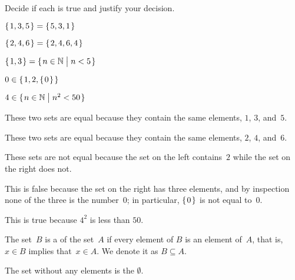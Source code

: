 \documentclass{ibl}  %
\begin{document}
\begin{problem}[\midlength] 
Decide if each is true and justify your decision.
\begin{items}
\item $\mbox{$\{\hspace{0.1em}1,3,5\hspace{0.1em}\}$}=\mbox{$\{\hspace{0.1em}5,3,1\hspace{0.1em}\}$}$    
\item $\mbox{$\{\hspace{0.1em}2, 4, 6\hspace{0.1em}\}$}=\mbox{$\{\hspace{0.1em}2, 4, 6, 4\hspace{0.1em}\}$}$    
\item $\mbox{$\{\hspace{0.1em}1, 3\hspace{0.1em}\}$}=\mbox{$\{\hspace{0.1em}n\in\mathbb{N}\bigm| n<5\hspace{0.1em}\}$}$ 
\item $0\in\mbox{$\{\hspace{0.1em}1,2,\mbox{$\{\hspace{0.1em}0\hspace{0.1em}\}$}\hspace{0.1em}\}$}$   
\item $4\in\mbox{$\{\hspace{0.1em}n\in\mathbb{N}\bigm| n^2<50\hspace{0.1em}\}$}$
\end{items}
\begin{answer}
\begin{items}
\item These two sets are equal because they contain the same elements, 
  $1$, $3$, and~$5$.
\item These two sets are equal because they contain the same elements, 
  $2$, $4$, and~$6$.
\item These sets are not equal because the set on the left contains~$2$
  while the set on the right does not.
\item This is false because the set on the right has three elements, 
  and by inspection none of the three is the number~$0$;
  in particular, $\mbox{$\{\hspace{0.1em}0\hspace{0.1em}\}$}$ is not equal to~$0$.
\item This is true because $4^2$ is less than $50$.    
\end{items}
\end{answer}
\end{problem}

\begin{df}
The set~$B$ is a  of the set~$A$
if every element of $B$ is an element of~$A$,
that is, $x\in B$ implies that~$x\in A$.
We denote it as $B\subseteq A$.
\end{df}

\begin{df}
The set without any elements is the  $\emptyset$.  
\end{df}
\end{document}
